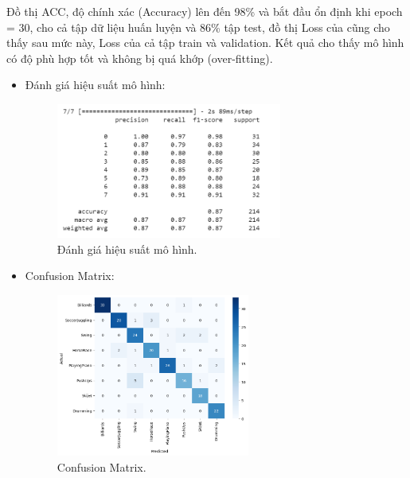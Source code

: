 Đồ thị ACC,  độ chính xác (Accuracy) lên đến 98\% và bắt đầu ổn định khi epoch = 30,  cho cả tập dữ liệu huấn luyện và 86\% tập test, đồ thị Loss của cũng cho thấy sau mức này, Loss của cả tập train và validation. Kết quả cho thấy mô hình có độ phù hợp tốt và không bị quá khớp (over-fitting).

\begin{itemize}
    \item Đánh giá hiệu suất mô hình:
    	
    	\begin{figure}[h!]
    		\centering
    		\includegraphics[width=0.7\textwidth]{Figures/evaluate_conv.PNG}
    		\caption[Đánh giá hiệu suất mô hình.]{Đánh giá hiệu suất mô hình.}
    		\label{fig:ac} 
    	\end{figure}
	
	\item Confusion Matrix:
	
	\begin{figure}[h!]
		\centering
		\includegraphics[width=0.6\textwidth]{Figures/conv_confusion.png}
		\caption[Confusion Matrix.]{Confusion Matrix.}
		\label{fig:conv_confusion.png} 
	\end{figure}
\end{itemize}

